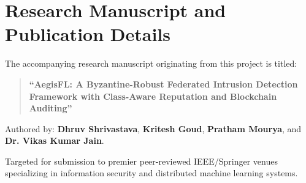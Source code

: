 \documentclass[12pt,a4paper]{report}
\begin{document}
\chapter{Research Manuscript and Publication Details}
The accompanying research manuscript originating from this project is titled:
\begin{quote}
\textbf{``AegisFL: A Byzantine-Robust Federated Intrusion Detection Framework with Class-Aware Reputation and Blockchain Auditing''}
\end{quote}
Authored by: \textbf{Dhruv Shrivastava}, \textbf{Kritesh Goud}, \textbf{Pratham Mourya}, and \textbf{Dr. Vikas Kumar Jain}. 

Targeted for submission to premier peer-reviewed IEEE/Springer venues specializing in information security and distributed machine learning systems.
\end{document}

